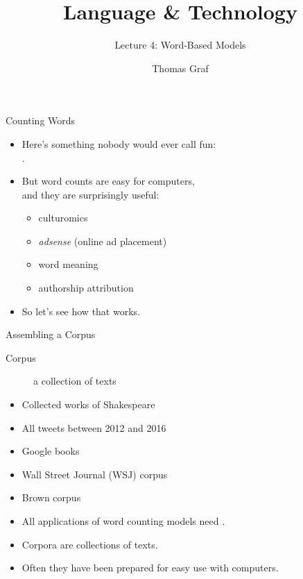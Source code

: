 \documentclass[professionalfonts, xcolor={usenames,svgnames,x11names,table}]{beamer}
\title{\texorpdfstring{Language \& Technology}{Language and Technology}}
\subtitle{Lecture 4: Word-Based Models}
\author{Thomas Graf}
\institute{Stony Brook University\\\texttt{lin120@thomasgraf.net}}
\date{}
\begin{document}
\unnumbered{
\begin{frame}
	\titlepage
\end{frame}
}

\begin{frame}{Counting Words}
    \begin{itemize}
        \item Here's something nobody would ever call fun:\\
            .
        \item But word counts are easy for computers,\\
            and they are surprisingly useful:
            \begin{itemize}
                \item culturomics
                \item \emph{adsense} (online ad placement)
                \item word meaning
                \item authorship attribution
            \end{itemize}
        \item So let's see how that works.
    \end{itemize}
\end{frame}

\begin{frame}{Assembling a Corpus}
    \begin{description}
        \item[Corpus] a collection of texts
    \end{description}

    \begin{example}
        \begin{itemize}
            \item Collected works of Shakespeare
            \item All tweets between 2012 and 2016
            \item Google books
            \item Wall Street Journal (WSJ) corpus
            \item Brown corpus
        \end{itemize}
    \end{example}

    \begin{itemize}
        \item All applications of word counting models need .
        \item Corpora are collections of texts.
        \item Often they have been prepared for easy use with computers.
    \end{itemize}
\end{frame}
\end{document}
